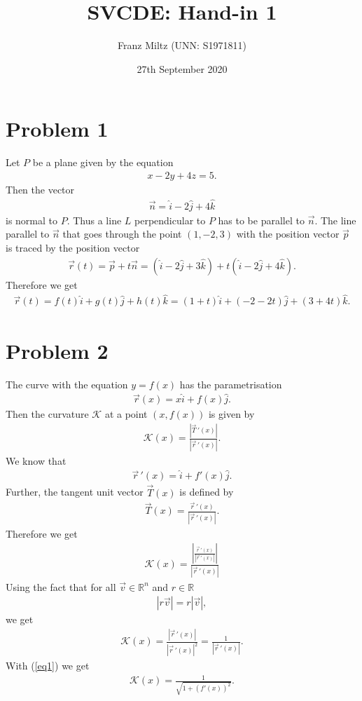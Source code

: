 \documentclass{article}
\title{SVCDE: Hand-in 1}
\author{Franz Miltz (UNN: S1971811)}
\newcommand{\R}{\mathbb{R}}
\newcommand{\ih}{\widehat i}
\newcommand{\jh}{\widehat j}
\newcommand{\kh}{\widehat k}
\newcommand{\K}{\mathcal{K}}
\newcommand{\dv}[1]{\vec #1\, '}
\renewcommand{\d}[1]{#1'}
\begin{document}
\date{27th September 2020}
\maketitle
\section*{Problem 1}
Let $P$ be a plane given by the equation
\begin{align*}
  x - 2y + 4z = 5.
\end{align*}
Then the vector
\begin{align*}
  \vec n = \ih - 2 \jh + 4 \kh
\end{align*}
is normal to $P$. Thus a line $L$ perpendicular to $P$ has to be
parallel to $\vec n$. The line parallel to $\vec n$ that goes through
the point $(1,-2,3)$ with the position vector $\vec p$ is traced by the position vector
\begin{align*}
  \vec r(t) = \vec p + t \vec n
  = (\ih - 2\jh + 3\kh) + t(\ih - 2\jh + 4\kh).
\end{align*}
Therefore we get
\begin{align*}
  \vec r (t) = f(t)\ih + g(t)\jh + h(t)\kh = (1+t)\ih+(-2-2t)\jh+(3+4t)\kh.
\end{align*}
\section*{Problem 2}
The curve with the equation $y=f(x)$ has the parametrisation
\begin{align*}
  \vec r(x) = x \ih + f(x) \jh.
\end{align*}
Then the curvature $\K$ at a point $(x, f(x))$ is given by
\begin{align*}
  \K(x) = \frac{\left|\dv T(x)\right|}{\left|\dv r(x)\right|}.
\end{align*}
We know that 
\begin{align}
  \label{eq1}
  \dv r (x) = \ih + \d f(x) \jh.
\end{align}
Further, the tangent unit vector $\vec T(x)$ is defined by
\begin{align*}
  \vec T(x) = \frac{\dv r(x)}{\left|\dv r(x)\right|}.
\end{align*}
Therefore we get
\begin{align*}
  \K(x) = \frac{\left|\frac{\dv r(x)}{\left|\dv r(x)\right|}\right|}{\left|\dv r(x)\right|}
\end{align*}
Using the fact that for all $\vec v \in \R^n$ and $r\in\R$
\begin{align*}
  \left|r\vec v\right| = r\left|\vec v\right|,
\end{align*}
we get
\begin{align*}
  \K(x) = \frac{\left|\dv r(x)\right|}{\left|\dv r(x)\right|^2} = \frac{1}{|\dv r(x)|}.
\end{align*}
With (\ref{eq1}) we get
\begin{align*}
  \K(x) = \frac{1}{\sqrt{1+\left(\d f(x)\right)^2}}.
\end{align*}
\end{document}
